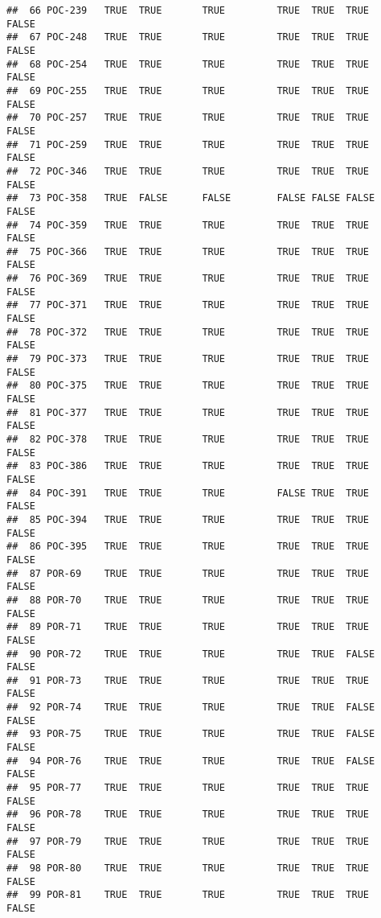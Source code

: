 \documentclass[]{article}
\begin{document}
\begin{verbatim}
##  66 POC-239   TRUE  TRUE       TRUE         TRUE  TRUE  TRUE    FALSE     
##  67 POC-248   TRUE  TRUE       TRUE         TRUE  TRUE  TRUE    FALSE     
##  68 POC-254   TRUE  TRUE       TRUE         TRUE  TRUE  TRUE    FALSE     
##  69 POC-255   TRUE  TRUE       TRUE         TRUE  TRUE  TRUE    FALSE     
##  70 POC-257   TRUE  TRUE       TRUE         TRUE  TRUE  TRUE    FALSE     
##  71 POC-259   TRUE  TRUE       TRUE         TRUE  TRUE  TRUE    FALSE     
##  72 POC-346   TRUE  TRUE       TRUE         TRUE  TRUE  TRUE    FALSE     
##  73 POC-358   TRUE  FALSE      FALSE        FALSE FALSE FALSE   FALSE     
##  74 POC-359   TRUE  TRUE       TRUE         TRUE  TRUE  TRUE    FALSE     
##  75 POC-366   TRUE  TRUE       TRUE         TRUE  TRUE  TRUE    FALSE     
##  76 POC-369   TRUE  TRUE       TRUE         TRUE  TRUE  TRUE    FALSE     
##  77 POC-371   TRUE  TRUE       TRUE         TRUE  TRUE  TRUE    FALSE     
##  78 POC-372   TRUE  TRUE       TRUE         TRUE  TRUE  TRUE    FALSE     
##  79 POC-373   TRUE  TRUE       TRUE         TRUE  TRUE  TRUE    FALSE     
##  80 POC-375   TRUE  TRUE       TRUE         TRUE  TRUE  TRUE    FALSE     
##  81 POC-377   TRUE  TRUE       TRUE         TRUE  TRUE  TRUE    FALSE     
##  82 POC-378   TRUE  TRUE       TRUE         TRUE  TRUE  TRUE    FALSE     
##  83 POC-386   TRUE  TRUE       TRUE         TRUE  TRUE  TRUE    FALSE     
##  84 POC-391   TRUE  TRUE       TRUE         FALSE TRUE  TRUE    FALSE     
##  85 POC-394   TRUE  TRUE       TRUE         TRUE  TRUE  TRUE    FALSE     
##  86 POC-395   TRUE  TRUE       TRUE         TRUE  TRUE  TRUE    FALSE     
##  87 POR-69    TRUE  TRUE       TRUE         TRUE  TRUE  TRUE    FALSE     
##  88 POR-70    TRUE  TRUE       TRUE         TRUE  TRUE  TRUE    FALSE     
##  89 POR-71    TRUE  TRUE       TRUE         TRUE  TRUE  TRUE    FALSE     
##  90 POR-72    TRUE  TRUE       TRUE         TRUE  TRUE  FALSE   FALSE     
##  91 POR-73    TRUE  TRUE       TRUE         TRUE  TRUE  TRUE    FALSE     
##  92 POR-74    TRUE  TRUE       TRUE         TRUE  TRUE  FALSE   FALSE     
##  93 POR-75    TRUE  TRUE       TRUE         TRUE  TRUE  FALSE   FALSE     
##  94 POR-76    TRUE  TRUE       TRUE         TRUE  TRUE  FALSE   FALSE     
##  95 POR-77    TRUE  TRUE       TRUE         TRUE  TRUE  TRUE    FALSE     
##  96 POR-78    TRUE  TRUE       TRUE         TRUE  TRUE  TRUE    FALSE     
##  97 POR-79    TRUE  TRUE       TRUE         TRUE  TRUE  TRUE    FALSE     
##  98 POR-80    TRUE  TRUE       TRUE         TRUE  TRUE  TRUE    FALSE     
##  99 POR-81    TRUE  TRUE       TRUE         TRUE  TRUE  TRUE    FALSE     

\end{verbatim}
\end{document}

